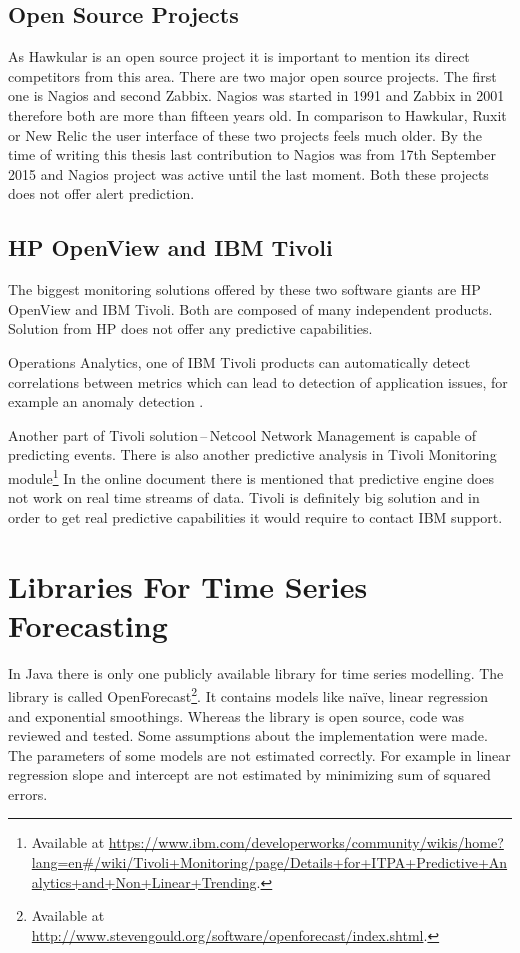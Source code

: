         \subsection{Open Source Projects}
        As Hawkular is an open source project it is important to mention its direct competitors from this area.
        There are two major open source projects. The first one is Nagios and second Zabbix. Nagios was started in
        1991 and Zabbix in 2001 therefore both are more than fifteen years old. In comparison to Hawkular, Ruxit or
        New Relic the user interface of these two projects feels much older. By the time of writing this thesis
        last contribution to Nagios was from 17th September 2015 and Nagios project was active until the last moment.
        Both these projects does not offer alert prediction.

        \subsection{HP OpenView and IBM Tivoli}
        The biggest monitoring solutions offered by these two software giants are HP OpenView and IBM Tivoli. Both are
        composed of many independent products. Solution from HP does not offer any predictive capabilities.

        Operations Analytics, one of IBM Tivoli products can automatically detect correlations between
        metrics which can lead to detection of application issues, for example an anomaly detection
        \cite{tivoli-predictive-insights}.

        Another part of Tivoli solution\,--\,Netcool Network Management is capable
        of predicting events. There is also another predictive analysis in Tivoli Monitoring
        module\footnote{Available at
        \url{https://www.ibm.com/developerworks/community/wikis/home?lang=en\#/wiki/Tivoli+Monitoring/page/Details+for+ITPA+Predictive+Analytics+and+Non+Linear+Trending}.}
        In the online document there is mentioned that predictive engine does not work on real time streams of data. Tivoli
        is definitely big solution and in order to get real predictive capabilities it would require to contact IBM
        support.

    \section{Libraries For Time Series Forecasting} \label{sec:libraries-for-ts}
    In Java there is only one publicly available library for time series modelling. The library is called
    OpenForecast\footnote{Available at \url{http://www.stevengould.org/software/openforecast/index.shtml}.}. It contains
    models like na\"{i}ve, linear regression and exponential smoothings. Whereas the library is open source, code
    was reviewed and tested. Some assumptions about the implementation were made. The parameters of some models are
    not estimated correctly. For example in linear regression slope and intercept are not estimated by minimizing
    sum of squared errors.

